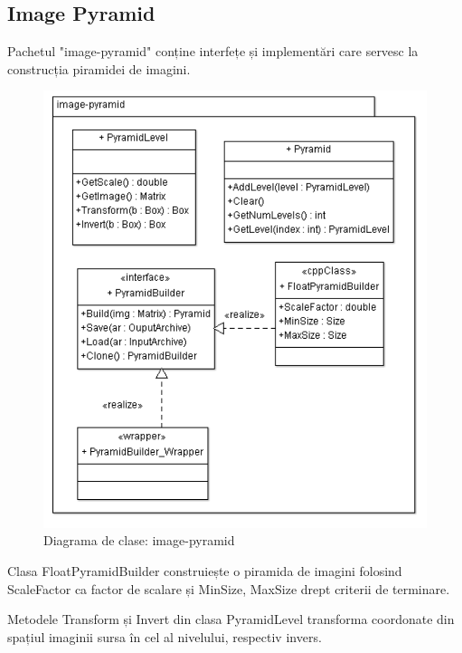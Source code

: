 \subsection{Image Pyramid}
Pachetul "image-pyramid" conține interfețe și implementări care servesc la construcția piramidei de imagini.
\begin{figure}[H]
	\centering
	\includegraphics[width=1.00\textwidth]{uml/imagepyramidClassDiagram.png}
	\caption{Diagrama de clase: image-pyramid}
	\label{fig:imagepyramidClassDiagram}
\end{figure}


Clasa FloatPyramidBuilder construiește o piramida de imagini folosind ScaleFactor ca factor de scalare și MinSize, MaxSize drept criterii de terminare.

Metodele Transform și Invert din clasa PyramidLevel transforma coordonate din spațiul imaginii sursa în cel al nivelului, respectiv invers.

